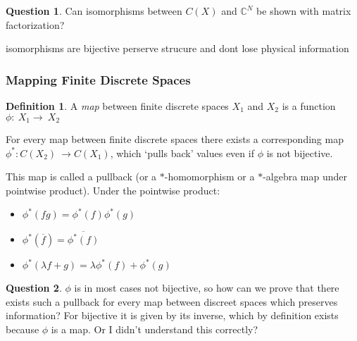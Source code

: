 \documentclass[a4paper]{article}
\theoremstyle{definition}
\newtheorem{definition}{Definition}
\theoremstyle{definition}
\newtheorem{question}{Question}
\theoremstyle{theorem}
\theoremstyle{theorem}
\theoremstyle{definition}
\begin{document}
\begin{question}
    Can isomorphisms between $C(X)$ and $\mathbb{C}^N$ be shown with matrix factorization?
\end{question}
    isomorphisms are bijective perserve strucure and dont lose physical information

\subsubsection{Mapping Finite Discrete Spaces}

\begin{definition}
    A \textit{map} between finite discrete spaces $X_1$ and $X_2$ is a function $\phi:\ X_1 \rightarrow\ X_2$
\end{definition}

For every map between finite discrete spaces there exists a corresponding map \\
$\phi ^*:C(X_2)\ \rightarrow C(X_1)$, which `pulls back' values even if $\phi$ is not bijective.

This map is called a pullback (or a $*$-homomorphism or a $*$-algebra map under pointwise product).
Under the pointwise product:
\begin{itemize}
    \item $\phi ^*(fg) = \phi ^*(f) \phi ^*(g)$
    \item $\phi ^*(\overline{f}) = \overline{\phi ^*(f)}$
    \item $\phi ^*(\lambda f + g) = \lambda \phi ^*(f) + \phi ^*(g)$
\end{itemize}

\begin{question}
    $\phi$ is in most cases not bijective, so how can we prove that there exists such a
    pullback for every map between discreet spaces which preserves information? For bijective
    it is given by its inverse, which by definition exists because $\phi$ is a map.
    Or I didn't understand this correctly?
\end{question}
\end{document}
